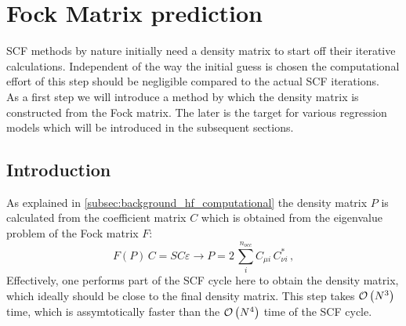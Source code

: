 \chapter{Fock Matrix prediction}
\label{chap:fock_matrix_predictions}

SCF methods by nature initially need a density matrix to start off their iterative calculations. Independent of the way the initial guess is chosen the computational effort of this step should be negligible compared to the actual SCF iterations.\\
As a first step we will introduce a method by which the density matrix is constructed from the Fock matrix. The later is the target for various regression models which will be introduced in the subsequent sections.


\section{Introduction}
\label{sec:Fock_mathcalrix_prediction_intro}
As explained in \autoref{subsec:background_hf_computational} the density matrix $P$ is calculated from the coefficient matrix $C$ which is obtained from the eigenvalue problem of the Fock matrix $F$:
\begin{equation}
    \label{eq:density_reconstruction_from_fock}
    F(P)\,C = SC\varepsilon \rightarrow P = 2\,\sum_{i}^{n_{occ}} C_{\mu i}\,C^*_{\nu i}\,,%
\end{equation}
Effectively, one performs part of the SCF cycle here to obtain the density matrix, which ideally should be close to the final density matrix. This step takes $\mathcal{O}\left(N^3\right)$ time, which is assymtotically faster than the $\mathcal{O}\left(N^4\right)$ time of the SCF cycle. 


